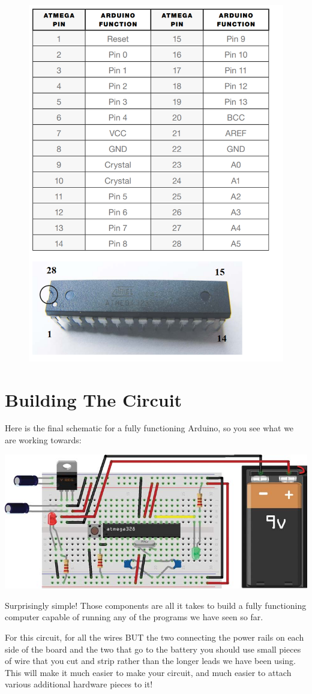\documentclass[11pt]{article}
\begin{document}
\begin{figure}[H]
  \centering
  \includegraphics[width=.7\linewidth]{figures/atmega-pinout.png}
  \caption{\label{fig:atmega-pinoutput}}
\end{figure}

\section{Building The Circuit}
\label{sec-3}

Here is the final schematic for a fully functioning Arduino, so you see what we are
working towards:

\centerline{
  \includegraphics[width=.7\linewidth]{figures/build-6.png}
}

Surprisingly simple! Those components are all it takes to build a fully functioning
computer capable of running any of the programs we have seen so far.

For this circuit, for all the wires BUT the two connecting the power rails on each
side of the board and the two that go to the battery you should use small pieces of
wire that you cut and strip rather than the longer leads we have been using. This
will make it much easier to make your circuit, and much easier to attach various
additional hardware pieces to it!
\end{document}
